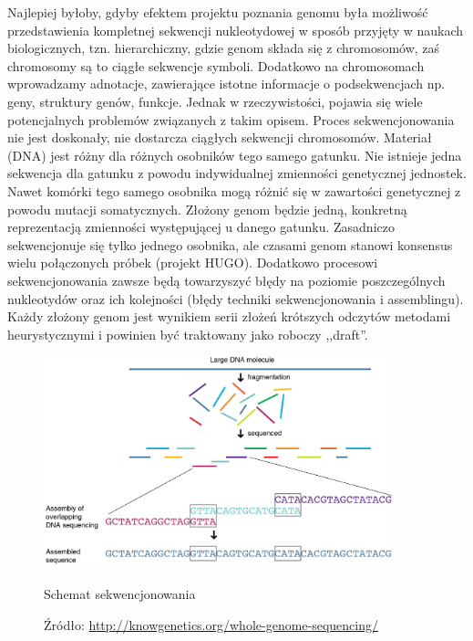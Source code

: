 Najlepiej byłoby, gdyby efektem projektu poznania genomu była możliwość przedstawienia kompletnej sekwencji nukleotydowej w sposób przyjęty w naukach biologicznych, tzn. hierarchiczny, gdzie genom składa się z chromosomów, zaś chromosomy są to ciągłe sekwencje symboli.
Dodatkowo na chromosomach wprowadzamy adnotacje, zawierające istotne informacje o podsekwencjach np. geny, struktury genów, funkcje.
Jednak w rzeczywistości, pojawia się wiele potencjalnych problemów związanych z takim opisem.
Proces sekwencjonowania nie jest doskonały, nie dostarcza ciągłych sekwencji chromosomów.
Materiał (DNA) jest różny dla różnych osobników tego samego gatunku. 
Nie istnieje jedna sekwencja dla gatunku z powodu indywidualnej zmienności genetycznej jednostek. 
Nawet komórki tego samego osobnika mogą różnić się w zawartości genetycznej z powodu mutacji somatycznych. 
Złożony genom będzie jedną, konkretną reprezentacją zmienności występującej u danego gatunku. 
Zasadniczo sekwencjonuje się tylko jednego osobnika, ale czasami genom stanowi konsensus wielu połączonych próbek (projekt HUGO). 
Dodatkowo procesowi sekwencjonowania zawsze będą towarzyszyć błędy na poziomie poszczególnych nukleotydów oraz ich kolejności (błędy techniki sekwencjonowania i assemblingu).
Każdy złożony genom jest wynikiem serii złożeń krótszych odczytów metodami heurystycznymi i powinien być traktowany jako roboczy ,,draft''.

\begin{figure}[h]
	\centering
	\includegraphics[width=0.9\textwidth]{img/sequenctioning-process.png}
	\caption{Schemat sekwencjonowania}
	\vspace{-0.5cm}
	\caption*{\scriptsize Źródło: \url{http://knowgenetics.org/whole-genome-sequencing/}}
	\label{img:schemat-sekwencjonowania}
\end{figure}

